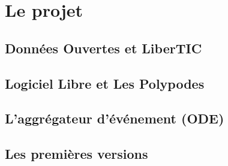 \section{Le projet}

\subsection{Données Ouvertes et LiberTIC}

\subsection{Logiciel Libre et Les Polypodes}

\subsection{L'aggrégateur d'événement (ODE)}

\subsection{Les premières versions}